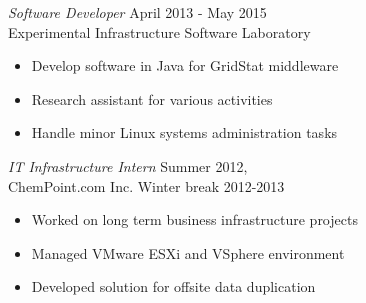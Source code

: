 \documentclass[line, margin]{res}
\begin{document}
\begin{resume}
                {\sl Software Developer} \hfill       April 2013 - May 2015 \\
                Experimental Infrastructure Software Laboratory
            \begin{itemize} \itemsep -2pt
                    \item Develop software in Java for GridStat middleware
                    \item Research assistant for various activities
                    \item Handle minor Linux systems administration tasks
                \end{itemize}
 
                {\sl IT Infrastructure Intern} \hfill           Summer 2012,\\
                ChemPoint.com Inc. \hfill Winter break 2012-2013
                 \begin{itemize}  \itemsep -2pt %
                 \item  Worked on long term business infrastructure projects
                 \item  Managed VMware ESXi and VSphere environment
                 \item  Developed solution for offsite data duplication
                 \end{itemize} 
 


\end{resume}
\end{document}
